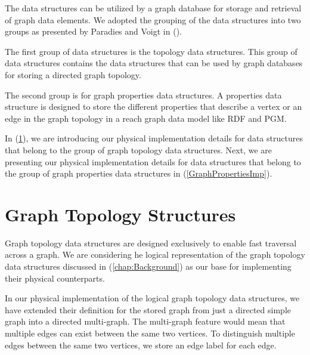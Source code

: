 {The data structures can be utilized by a graph database for storage and retrieval of graph data elements. We adopted the grouping of the data structures into two groups as presented by Paradies and Voigt in (\cite{Paradies2017}). 

The first group of data structures is the topology data structures. This group of data structures contains the data structures that can be used by graph databases for storing a directed graph topology.

The second group is for graph properties data structures. A properties data structure is designed to store the different properties that describe a vertex or an edge in the graph topology in a reach graph data model like RDF and PGM.

In (\ref{GraphTopolgyImp}), we are introducing our physical implementation details for data structures that belong to the group of graph topology data structures. Next, we are presenting our physical implementation details for data structures that belong to the group of graph properties data structures in (\ref{GraphPropertiesImp}).


\section{Graph Topology Structures}
\label{GraphTopolgyImp}

Graph topology data structures are designed exclusively to enable fast traversal across a graph. We are considering he logical representation of the graph topology data structures discussed in (\ref{chap:Background}) as our base for implementing their physical counterparts. 

In our physical implementation of the logical graph topology data structures, we have extended their definition for the stored graph from just a directed simple graph into a directed multi-graph. The multi-graph feature would mean that multiple edges can exist between the same two vertices. To distinguish multiple edges between the same two vertices, we store an edge label for each edge.



}
